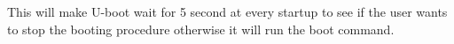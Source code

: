 \documentclass[11pt
  , a4paper
  , article
  , oneside
  , showtrims
]{memoir}
\begin{document}
This will make U-boot wait for 5 second at every startup to see if the user wants to stop the booting procedure otherwise it will run the boot command.



\clearpage
\backmatter
%
%
%

%

\end{document}
